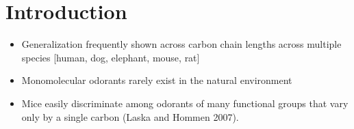 \section{Introduction}
\begin{itemize}
\item Generalization frequently shown across carbon chain lengths across multiple species [human, dog, elephant, mouse, rat]
\item Monomolecular odorants rarely exist in the natural environment
\item Mice easily discriminate among odorants of many functional groups that vary only by a single carbon (Laska and Hommen 2007).
\end{itemize}